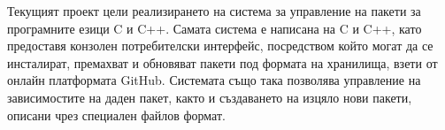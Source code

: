Текущият проект цели реализирането на система за управление на пакети за
програмните езици C и C++. Самата система е написана на C и C++, като предоставя
конзолен потребителски интерфейс, посредством който могат да се инсталират,
премахват и обновяват пакети под формата на хранилища, взети от онлайн
платформата GitHub. Системата също така позволява управление на зависимостите
на даден пакет, както и създаването на изцяло нови пакети, описани чрез
специален файлов формат.